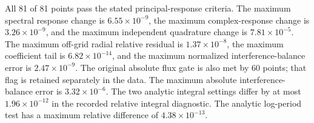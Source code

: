 All 81 of 81 points pass the stated principal-response criteria. The maximum spectral response change is $6.55\times10^{-9}$, the maximum complex-response change is $3.26\times10^{-9}$, and the maximum independent quadrature change is $7.81\times10^{-5}$. The maximum off-grid radial relative residual is $1.37\times10^{-8}$, the maximum coefficient tail is $6.82\times10^{-14}$, and the maximum normalized interference-balance error is $2.47\times10^{-9}$. The original absolute flux gate is also met by 60 points; that flag is retained separately in the data.
The maximum absolute interference-balance error is $3.32\times10^{-6}$. The two analytic integral settings differ by at most $1.96\times10^{-12}$ in the recorded relative integral diagnostic. The analytic log-period test has a maximum relative difference of $4.38\times10^{-13}$.
